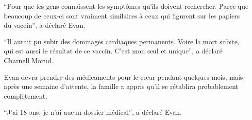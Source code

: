 {“Pour que les gens connaissent les symptômes qu'ils doivent rechercher. Parce
que beaucoup de ceux-ci sont vraiment similaires à ceux qui figurent sur les
papiers du vaccin”, a déclaré Evan.

“Il aurait pu subir des dommages cardiaques permanents. Voire la mort subite,
qui est aussi le résultat de ce vaccin. C'est mon seul et unique”, a déclaré
Charnell Morud.

Evan devra prendre des médicaments pour le cœur pendant quelques mois, mais
après une semaine d'attente, la famille a appris qu'il se rétablira probablement
complètement.

“J'ai 18 ans, je n'ai aucun dossier médical”, a déclaré Evan.

}
